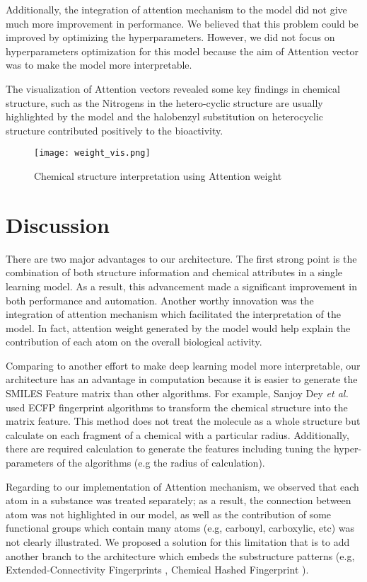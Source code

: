 \documentclass[conference]{IEEEtran}
\begin{document}
Additionally, the integration of attention mechanism to the model did not give much more improvement in performance. We believed that this problem could be improved by optimizing the hyperparameters. However, we did not focus on hyperparameters optimization for this model because the aim of Attention vector was to make the model more interpretable.

The visualization of Attention vectors revealed some key findings in chemical structure, such as the Nitrogens in the hetero-cyclic structure are usually highlighted by the model and the halobenzyl substitution on heterocyclic structure contributed positively to the bioactivity.

\begin{figure}[ht]
    \centering
    \texttt{[image: weight\_vis.png]}
    \caption{Chemical structure interpretation using Attention weight}
    \label{fig:weight_vis}
\end{figure}


 
\section{Discussion}
There are two major advantages to our architecture. The first strong point is the combination of both structure information and chemical attributes in a single learning model. As a result, this advancement made a significant improvement in both performance and automation. Another worthy innovation was the integration of attention mechanism which facilitated the interpretation of the model. In fact, attention weight generated by the model would help explain the contribution of each atom on the overall biological activity.

Comparing to another effort to make deep learning model more interpretable, our architecture has an advantage in computation because it is easier to generate the SMILES Feature matrix than other algorithms. For example, Sanjoy Dey \textit{et al.} \cite{Dey2018} used ECFP fingerprint algorithms to transform the chemical structure into the matrix feature. This method does not treat the molecule as a whole structure but calculate on each fragment of a chemical with a particular radius. Additionally, there are required calculation to generate the features including tuning the hyper-parameters of the algorithms (e.g the radius of calculation).

Regarding to our implementation of Attention mechanism, we observed that each atom in a substance was treated separately; as a result, the connection between atom was not highlighted in our model, as well as the contribution of some functional groups which contain many atoms (e.g, carbonyl, carboxylic, etc) was not clearly illustrated. We proposed a solution for this limitation that is to add another branch to the architecture which embeds the substructure patterns (e.g, Extended-Connectivity Fingerprints \cite{Rogers2010}, Chemical Hashed Fingerprint \cite{Al-Lazikani2004}).
\end{document}

